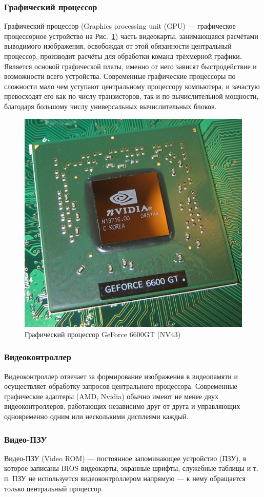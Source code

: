 \subsubsection{Графический процессор}

Графический процессор (Graphics processing unit (GPU) — графическое процессорное устройство на Рис.~\ref{ris:gpu}) часть видеокарты, занимающаяся расчётами выводимого изображения, освобождая от этой обязанности центральный процессор, производит расчёты для обработки команд трёхмерной графики. Является основой графической платы, именно от него зависят быстродействие и возможности всего устройства. Современные графические процессоры по сложности мало чем уступают центральному процессору компьютера, и зачастую превосходят его как по числу транзисторов, так и по вычислительной мощности, благодаря большому числу универсальных вычислительных блоков.

\begin{figure}[ht!]
\begin{center}
\includegraphics[width=0.3\linewidth]{img/6600GT_GPU.jpg}
\caption{Графический процессор GeForce 6600GT (NV43)}
\label{ris:gpu}
\end{center}
\end{figure}

\subsubsection{Видеоконтроллер}

Видеоконтроллер отвечает за формирование изображения в видеопамяти и осуществляет обработку запросов центрального процессора. Современные графические адаптеры (AMD, Nvidia) обычно имеют не менее двух видеоконтроллеров, работающих независимо друг от друга и управляющих одновременно одним или несколькими дисплеями каждый.

\subsubsection{Видео-ПЗУ}

Видео-ПЗУ (Video ROM) — постоянное запоминающее устройство (ПЗУ), в которое записаны BIOS видеокарты, экранные шрифты, служебные таблицы и т. п. ПЗУ не используется видеоконтроллером напрямую — к нему обращается только центральный процессор.

